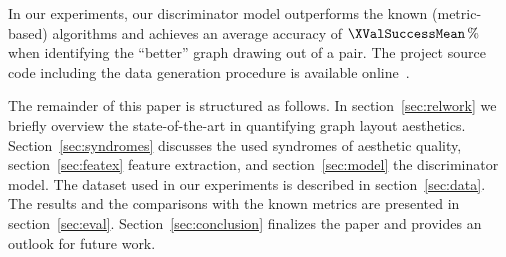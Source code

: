 In our experiments, our discriminator model outperforms the known (metric-based) algorithms and achieves an average
accuracy of $\XValSuccessMean\percent$ when identifying the \enquote{better} graph drawing out of a pair.  The project
source code including the data generation procedure is available online~\cite{GitHubRepo}.

The remainder of this paper is structured as follows.  In section~\ref{sec:relwork} we briefly overview the
state-of-the-art in quantifying graph layout aesthetics.  Section~\ref{sec:syndromes} discusses the used syndromes of
aesthetic quality, section~\ref{sec:featex} feature extraction, and section~\ref{sec:model} the discriminator model.
The dataset used in our experiments is described in section~\ref{sec:data}.  The results and the comparisons with the
known metrics are presented in section~\ref{sec:eval}.  Section~\ref{sec:conclusion} finalizes the paper and provides an
outlook for future work.
